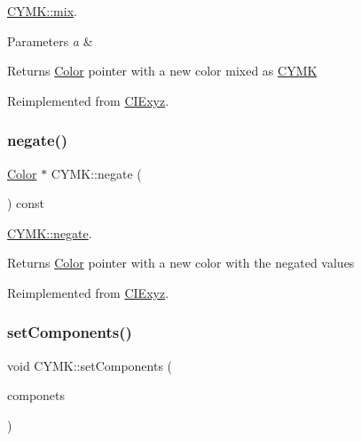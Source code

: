 \hyperlink{class_c_y_m_k_adeb4691eafbb53e15538a3d829f59a14}{C\+Y\+M\+K\+::mix}. 


\begin{DoxyParams}{Parameters}
{\em a} & \\
\hline
\end{DoxyParams}
\begin{DoxyReturn}{Returns}
\hyperlink{class_color}{Color} pointer with a new color mixed as \hyperlink{class_c_y_m_k}{C\+Y\+MK} 
\end{DoxyReturn}


Reimplemented from \hyperlink{class_c_i_exyz_af8eeb48ade44beea43d023b36d263fc8}{C\+I\+Exyz}.

\mbox{\label{class_c_y_m_k_a397c0109e76ff6cc331b49e4b73623ef}} 
\subsubsection{\texorpdfstring{negate()}{negate()}}
{\footnotesize\ttfamily \hyperlink{class_color}{Color} $\ast$ C\+Y\+M\+K\+::negate (\begin{DoxyParamCaption}{ }\end{DoxyParamCaption}) const\hspace{0.3cm}{\ttfamily [virtual]}}



\hyperlink{class_c_y_m_k_a397c0109e76ff6cc331b49e4b73623ef}{C\+Y\+M\+K\+::negate}. 

\begin{DoxyReturn}{Returns}
\hyperlink{class_color}{Color} pointer with a new color with the negated values 
\end{DoxyReturn}


Reimplemented from \hyperlink{class_c_i_exyz_a4a454df6cbb71f3fcfd2d1ea9d500d94}{C\+I\+Exyz}.

\mbox{\label{class_c_y_m_k_a897a2a1030cfd10dc16d5e2de825b45e}} 
\subsubsection{\texorpdfstring{set\+Components()}{setComponents()}}
{\footnotesize\ttfamily void C\+Y\+M\+K\+::set\+Components (\begin{DoxyParamCaption}\item[{Q\+Vector$<$ double $>$}]{componets }\end{DoxyParamCaption})\hspace{0.3cm}{\ttfamily [virtual]}}



